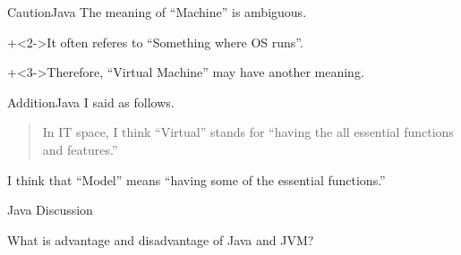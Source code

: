 \begin{frame}{Caution}{Java}
    The meaning of ``Machine'' is ambiguous.
    \vspace{2ex}

    \onslide+<2->{It often referes to ``Something where OS runs''.}
    \vspace{4ex}

    \onslide+<3->{Therefore, ``Virtual Machine'' may have another meaning.}
\end{frame}


\begin{frame}{Addition}{Java}
    I said as follows.
    \vspace{4ex}

    \begin{quote}In IT space, I think ``Virtual'' stands for
    ``having the all essential functions and features.''\end{quote}
    \vspace{4ex}

    I think that ``Model'' means ``having some of the essential functions.''
\end{frame}


\begin{frame}{Java}{}
    Discussion
    \vspace{4ex}

    What is advantage and disadvantage of Java and JVM?
\end{frame}
